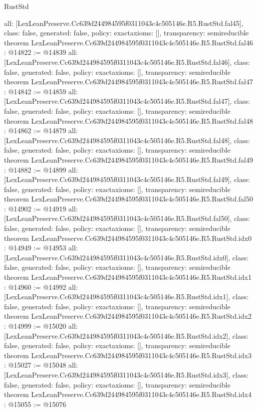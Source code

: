 \begin{lexlean}{RustStd}
\begin{coremodule}
{  all: [LexLeanPreserve.Cc639d244984595f0311043c4c505146e.R5.RustStd.fal45],
  class: false,
  generated: false,
  policy: exact{axioms: []},
  transparency: semireducible
}
theorem LexLeanPreserve.Cc639d244984595f0311043c4c505146e.R5.RustStd.fal46 : @14822 := @14839 {
  all: [LexLeanPreserve.Cc639d244984595f0311043c4c505146e.R5.RustStd.fal46],
  class: false,
  generated: false,
  policy: exact{axioms: []},
  transparency: semireducible
}
theorem LexLeanPreserve.Cc639d244984595f0311043c4c505146e.R5.RustStd.fal47 : @14842 := @14859 {
  all: [LexLeanPreserve.Cc639d244984595f0311043c4c505146e.R5.RustStd.fal47],
  class: false,
  generated: false,
  policy: exact{axioms: []},
  transparency: semireducible
}
theorem LexLeanPreserve.Cc639d244984595f0311043c4c505146e.R5.RustStd.fal48 : @14862 := @14879 {
  all: [LexLeanPreserve.Cc639d244984595f0311043c4c505146e.R5.RustStd.fal48],
  class: false,
  generated: false,
  policy: exact{axioms: []},
  transparency: semireducible
}
theorem LexLeanPreserve.Cc639d244984595f0311043c4c505146e.R5.RustStd.fal49 : @14882 := @14899 {
  all: [LexLeanPreserve.Cc639d244984595f0311043c4c505146e.R5.RustStd.fal49],
  class: false,
  generated: false,
  policy: exact{axioms: []},
  transparency: semireducible
}
theorem LexLeanPreserve.Cc639d244984595f0311043c4c505146e.R5.RustStd.fal50 : @14902 := @14919 {
  all: [LexLeanPreserve.Cc639d244984595f0311043c4c505146e.R5.RustStd.fal50],
  class: false,
  generated: false,
  policy: exact{axioms: []},
  transparency: semireducible
}
theorem LexLeanPreserve.Cc639d244984595f0311043c4c505146e.R5.RustStd.idx0 : @14949 := @14953 {
  all: [LexLeanPreserve.Cc639d244984595f0311043c4c505146e.R5.RustStd.idx0],
  class: false,
  generated: false,
  policy: exact{axioms: []},
  transparency: semireducible
}
theorem LexLeanPreserve.Cc639d244984595f0311043c4c505146e.R5.RustStd.idx1 : @14960 := @14992 {
  all: [LexLeanPreserve.Cc639d244984595f0311043c4c505146e.R5.RustStd.idx1],
  class: false,
  generated: false,
  policy: exact{axioms: []},
  transparency: semireducible
}
theorem LexLeanPreserve.Cc639d244984595f0311043c4c505146e.R5.RustStd.idx2 : @14999 := @15020 {
  all: [LexLeanPreserve.Cc639d244984595f0311043c4c505146e.R5.RustStd.idx2],
  class: false,
  generated: false,
  policy: exact{axioms: []},
  transparency: semireducible
}
theorem LexLeanPreserve.Cc639d244984595f0311043c4c505146e.R5.RustStd.idx3 : @15027 := @15048 {
  all: [LexLeanPreserve.Cc639d244984595f0311043c4c505146e.R5.RustStd.idx3],
  class: false,
  generated: false,
  policy: exact{axioms: []},
  transparency: semireducible
}
theorem LexLeanPreserve.Cc639d244984595f0311043c4c505146e.R5.RustStd.idx4 : @15055 := @15076 {
}
\end{coremodule}
\end{lexlean}
